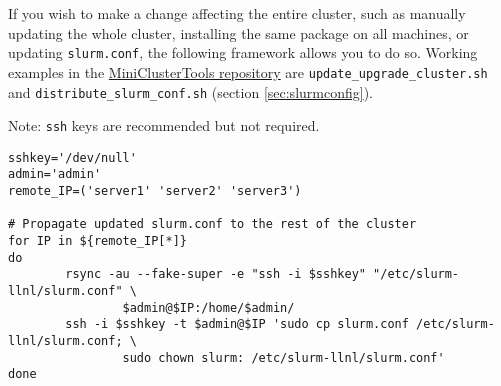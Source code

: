 If you wish to make a change affecting the entire cluster, such as manually updating the whole cluster, installing the same package on all machines, or updating \texttt{slurm.conf}, the following framework allows you to do so. Working examples in the \href{https://github.com/coyleej/MiniClusterTools}{MiniClusterTools repository} are \texttt{update\_upgrade\_cluster.sh} and \texttt{distribute\_slurm\_conf.sh} (section \ref{sec:slurmconfig}).

Note: \texttt{ssh} keys are recommended but not required. 

\begin{verbatim}
sshkey='/dev/null'
admin='admin'
remote_IP=('server1' 'server2' 'server3')

# Propagate updated slurm.conf to the rest of the cluster
for IP in ${remote_IP[*]}
do
        rsync -au --fake-super -e "ssh -i $sshkey" "/etc/slurm-llnl/slurm.conf" \
                $admin@$IP:/home/$admin/
        ssh -i $sshkey -t $admin@$IP 'sudo cp slurm.conf /etc/slurm-llnl/slurm.conf; \
                sudo chown slurm: /etc/slurm-llnl/slurm.conf'
done
\end{verbatim}
